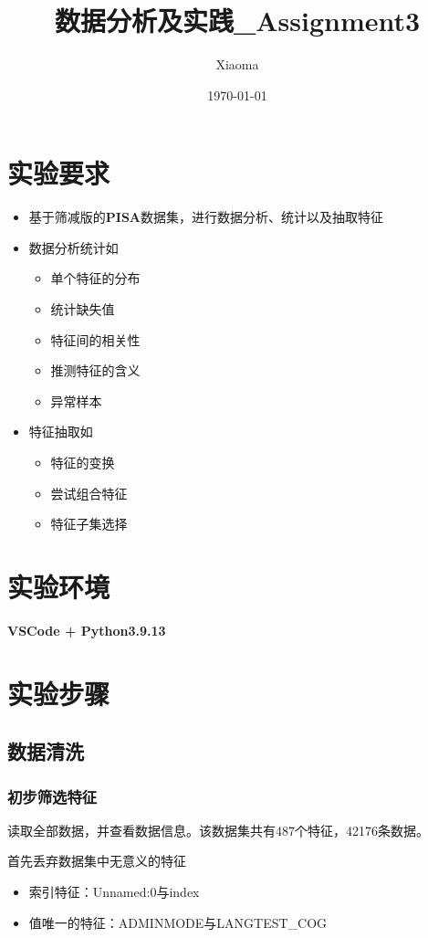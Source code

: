 \documentclass[12pt, a4paper, oneside]{ctexart}
\title{数据分析及实践\_Assignment3}
\author{Xiaoma}
\date{\today}
\begin{document}
\maketitle
\section{实验要求}
\begin{itemize}
    \item 基于筛减版的\textbf{PISA}数据集，进行数据分析、统计以及抽取特征
    \item 数据分析统计如\begin{itemize}
        \item 单个特征的分布
        \item 统计缺失值
        \item 特征间的相关性
        \item 推测特征的含义
        \item 异常样本
    
    \end{itemize}
    \item 特征抽取如\begin{itemize}
        \item 特征的变换
        \item 尝试组合特征
        \item 特征子集选择
    \end{itemize}
\end{itemize}

\newpage
\section{实验环境}
\textbf{VSCode + Python3.9.13}
\section{实验步骤}
\subsection{数据清洗}
\subsubsection{初步筛选特征}
读取全部数据，并查看数据信息。该数据集共有487个特征，42176条数据。

首先丢弃数据集中无意义的特征
\begin{itemize}
    \item 索引特征：Unnamed:0与index
    \item 值唯一的特征：ADMINMODE与LANGTEST\_COG
\end{itemize}
\end{document}
